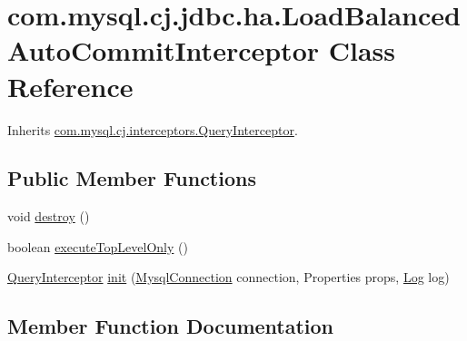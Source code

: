 \hypertarget{classcom_1_1mysql_1_1cj_1_1jdbc_1_1ha_1_1_load_balanced_auto_commit_interceptor}{}\section{com.\+mysql.\+cj.\+jdbc.\+ha.\+Load\+Balanced\+Auto\+Commit\+Interceptor Class Reference}
\label{classcom_1_1mysql_1_1cj_1_1jdbc_1_1ha_1_1_load_balanced_auto_commit_interceptor}


Inherits \mbox{\hyperlink{interfacecom_1_1mysql_1_1cj_1_1interceptors_1_1_query_interceptor}{com.\+mysql.\+cj.\+interceptors.\+Query\+Interceptor}}.

\subsection*{Public Member Functions}
\begin{DoxyCompactItemize}
\item 
void \mbox{\hyperlink{classcom_1_1mysql_1_1cj_1_1jdbc_1_1ha_1_1_load_balanced_auto_commit_interceptor_a57d2b1b50e5b81d3bf07df78f7e657c3}{destroy}} ()
\item 
boolean \mbox{\hyperlink{classcom_1_1mysql_1_1cj_1_1jdbc_1_1ha_1_1_load_balanced_auto_commit_interceptor_a048bf25ce3ec24d6db036ec6c4b49884}{execute\+Top\+Level\+Only}} ()
\item 
\mbox{\hyperlink{interfacecom_1_1mysql_1_1cj_1_1interceptors_1_1_query_interceptor}{Query\+Interceptor}} \mbox{\hyperlink{classcom_1_1mysql_1_1cj_1_1jdbc_1_1ha_1_1_load_balanced_auto_commit_interceptor_a72ccbcacf034135666a25f6f85b483f0}{init}} (\mbox{\hyperlink{interfacecom_1_1mysql_1_1cj_1_1_mysql_connection}{Mysql\+Connection}} connection, Properties props, \mbox{\hyperlink{interfacecom_1_1mysql_1_1cj_1_1log_1_1_log}{Log}} log)
\end{DoxyCompactItemize}


\subsection{Member Function Documentation}
\mbox{\label{classcom_1_1mysql_1_1cj_1_1jdbc_1_1ha_1_1_load_balanced_auto_commit_interceptor_a57d2b1b50e5b81d3bf07df78f7e657c3}} 
